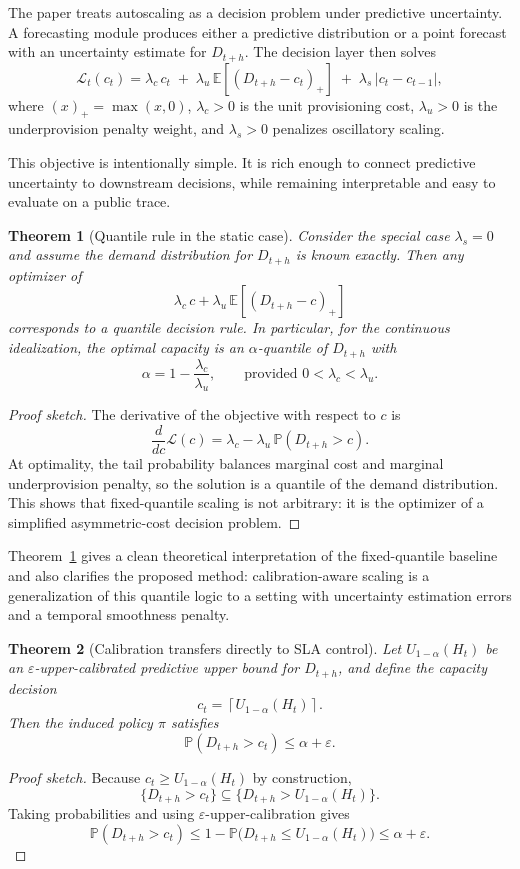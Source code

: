 \documentclass[11pt]{article}
\theoremstyle{plain}
\newtheorem{theorem}{Theorem}[section]
\theoremstyle{definition}
\theoremstyle{remark}
\begin{document}
The paper treats autoscaling as a decision problem under predictive uncertainty. A forecasting module produces either a predictive distribution or a point forecast with an uncertainty estimate for $D_{t+h}$. The decision layer then solves
\[
\mathcal{L}_t(c_t) =
\lambda_c \, c_t
\;+\;
\lambda_u \, \mathbb{E}\!\left[(D_{t+h} - c_t)_+\right]
\;+\;
\lambda_s \, |c_t - c_{t-1}|,
\]
where $(x)_+ = \max(x,0)$, $\lambda_c > 0$ is the unit provisioning cost, $\lambda_u > 0$ is the underprovision penalty weight, and $\lambda_s > 0$ penalizes oscillatory scaling.

This objective is intentionally simple. It is rich enough to connect predictive uncertainty to downstream decisions, while remaining interpretable and easy to evaluate on a public trace.

\begin{theorem}[Quantile rule in the static case]
\label{thm:quantile-rule}
Consider the special case $\lambda_s = 0$ and assume the demand distribution for $D_{t+h}$ is known exactly. Then any optimizer of
\[
\lambda_c \, c + \lambda_u \, \mathbb{E}\!\left[(D_{t+h} - c)_+\right]
\]
corresponds to a quantile decision rule. In particular, for the continuous idealization, the optimal capacity is an $\alpha$-quantile of $D_{t+h}$ with
\[
\alpha = 1 - \frac{\lambda_c}{\lambda_u},
\qquad \text{provided } 0 < \lambda_c < \lambda_u.
\]
\end{theorem}
\begin{proof}[Proof sketch]
The derivative of the objective with respect to $c$ is
\[
\frac{d}{dc}\mathcal{L}(c)
=
\lambda_c - \lambda_u \, \mathbb{P}(D_{t+h} > c).
\]
At optimality, the tail probability balances marginal cost and marginal underprovision penalty, so the solution is a quantile of the demand distribution. This shows that fixed-quantile scaling is not arbitrary: it is the optimizer of a simplified asymmetric-cost decision problem.
\end{proof}

Theorem~\ref{thm:quantile-rule} gives a clean theoretical interpretation of the fixed-quantile baseline and also clarifies the proposed method: calibration-aware scaling is a generalization of this quantile logic to a setting with uncertainty estimation errors and a temporal smoothness penalty.

\begin{theorem}[Calibration transfers directly to SLA control]
\label{thm:calibration-to-sla}
Let $U_{1-\alpha}(H_t)$ be an $\varepsilon$-upper-calibrated predictive upper bound for $D_{t+h}$, and define the capacity decision
\[
c_t = \left\lceil U_{1-\alpha}(H_t) \right\rceil.
\]
Then the induced policy $\pi$ satisfies
\[
\mathbb{P}(D_{t+h} > c_t) \le \alpha + \varepsilon.
\]
\end{theorem}
\begin{proof}[Proof sketch]
Because $c_t \ge U_{1-\alpha}(H_t)$ by construction,
\[
\{D_{t+h} > c_t\} \subseteq \{D_{t+h} > U_{1-\alpha}(H_t)\}.
\]
Taking probabilities and using $\varepsilon$-upper-calibration gives
\[
\mathbb{P}(D_{t+h} > c_t)
\le
1 - \mathbb{P}\!\bigl(D_{t+h} \le U_{1-\alpha}(H_t)\bigr)
\le
\alpha + \varepsilon.
\]
\end{proof}
\end{document}
